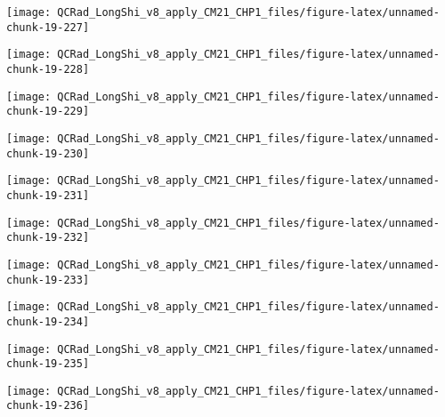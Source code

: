 \documentclass[
  10pt,
  a4paper,oneside]{article}
\begin{document}
\begin{center}\texttt{[image: QCRad\_LongShi\_v8\_apply\_CM21\_CHP1\_files/figure-latex/unnamed-chunk-19-227]} \end{center}

\begin{center}\texttt{[image: QCRad\_LongShi\_v8\_apply\_CM21\_CHP1\_files/figure-latex/unnamed-chunk-19-228]} \end{center}

\begin{center}\texttt{[image: QCRad\_LongShi\_v8\_apply\_CM21\_CHP1\_files/figure-latex/unnamed-chunk-19-229]} \end{center}

\begin{center}\texttt{[image: QCRad\_LongShi\_v8\_apply\_CM21\_CHP1\_files/figure-latex/unnamed-chunk-19-230]} \end{center}

\begin{center}\texttt{[image: QCRad\_LongShi\_v8\_apply\_CM21\_CHP1\_files/figure-latex/unnamed-chunk-19-231]} \end{center}

\begin{center}\texttt{[image: QCRad\_LongShi\_v8\_apply\_CM21\_CHP1\_files/figure-latex/unnamed-chunk-19-232]} \end{center}

\begin{center}\texttt{[image: QCRad\_LongShi\_v8\_apply\_CM21\_CHP1\_files/figure-latex/unnamed-chunk-19-233]} \end{center}

\begin{center}\texttt{[image: QCRad\_LongShi\_v8\_apply\_CM21\_CHP1\_files/figure-latex/unnamed-chunk-19-234]} \end{center}

\begin{center}\texttt{[image: QCRad\_LongShi\_v8\_apply\_CM21\_CHP1\_files/figure-latex/unnamed-chunk-19-235]} \end{center}

\begin{center}\texttt{[image: QCRad\_LongShi\_v8\_apply\_CM21\_CHP1\_files/figure-latex/unnamed-chunk-19-236]} \end{center}
\end{document}
